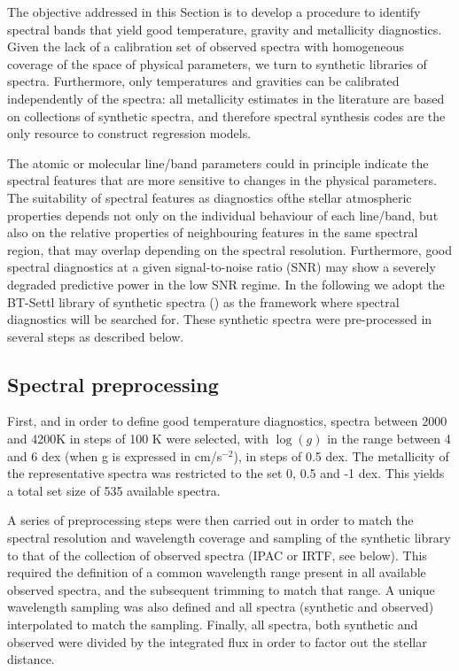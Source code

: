 The objective addressed in this Section is to develop a procedure to
identify spectral bands that yield good temperature, gravity and
metallicity diagnostics. Given the lack of a calibration set of
observed spectra with homogeneous coverage of the space of physical
parameters, we turn to synthetic libraries of spectra. Furthermore,
only temperatures and gravities can be calibrated independently of the
spectra: all metallicity estimates in the literature are based on
collections of synthetic spectra, and therefore spectral synthesis
codes are the only resource to construct regression models.

The atomic or molecular line/band parameters could in principle
indicate the spectral features that are more sensitive to changes in
the physical parameters. The suitability of spectral features as
diagnostics ofthe stellar atmospheric properties depends not only on
the individual behaviour of each line/band, but also on the relative
properties of neighbouring features in the same spectral region, that
may overlap depending on the spectral resolution. Furthermore, good
spectral diagnostics at a given signal-to-noise ratio (SNR) may show a
severely degraded predictive power in the low SNR regime. In the
following we adopt the BT-Settl library of synthetic spectra
(\cite{2013MSAIS..24..128A}) as the framework where spectral
diagnostics will be searched for. These synthetic spectra were
pre-processed in several steps as described below.

\subsection{Spectral preprocessing}

First, and in order to define good temperature diagnostics, spectra
between 2000 and 4200K in steps of 100 K were selected, with $\log(g)$
in the range between 4 and 6 dex (when g is expressed in cm/s$^{-2}$),
in steps of 0.5 dex. The metallicity of the representative spectra was
restricted to the set 0, 0.5 and -1 dex.  This yields a total set size
of 535 available spectra.

A series of preprocessing steps were then carried out in order to
match the spectral resolution and wavelength coverage and sampling of
the synthetic library to that of the collection of observed spectra
(IPAC or IRTF, see below). This required the definition of a common
wavelength range present in all available observed spectra, and the
subsequent trimming to match that range. A unique wavelength sampling
was also defined and all spectra (synthetic and observed) interpolated
to match the sampling. Finally, all spectra, both synthetic and
observed were divided by the integrated flux in order to factor out
the stellar distance.

